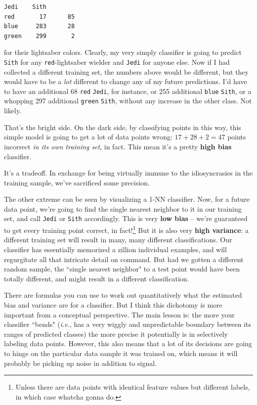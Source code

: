 \documentclass[12pt]{article}
\begin{document}
\begin{center}
\begin{Verbatim}[fontsize=\small,samepage=true,frame=none]
        Jedi    Sith
red       17      85
blue     283      28
green    299       2
\end{Verbatim}
\end{center}

for their lightsaber colors. Clearly, my very simply classifier is going to
predict \texttt{Sith} for any \texttt{red}-lightsaber wielder and
\texttt{Jedi} for anyone else. Now if I had collected a different training
set, the numbers above would be different, but they would have to be a
\textit{lot} different to change any of my future predictions. I'd have to
have an additional 68 \texttt{red} \texttt{Jedi}, for instance, or 255
additional \texttt{blue} \texttt{Sith}, or a whopping 297 additional
\texttt{green} \texttt{Sith}, without any increase in the other class. Not
likely.

That's the bright side. On the dark side, by classifying points in this way,
this simple model is going to get a lot of data points wrong: $17+28+2=47$
points incorrect \textit{in its own training set}, in fact. This mean it's a
pretty \textbf{high bias} classifier.

It's a tradeoff. In exchange for being virtually immune to the idiosyncrasies
in the training sample, we've sacrificed some precision.

The other extreme can be seen by visualizing a 1-NN classifier. Now, for a
future data point, we're going to find the single nearest neighbor to it in
our training set, and call \texttt{Jedi} or \texttt{Sith} accordingly. This is
very \textbf{low bias} -- we're guaranteed to get every training point
correct, in fact!\footnote{Unless there are data points with identical feature
values but different labels, in which case whatcha gonna do.} But it is also
very \textbf{high variance}: a different training set will result in many,
many different classifications. Our classifier has essentially memorized a
zillion individual examples, and will regurgitate all that intricate detail on
command. But had we gotten a different random sample, the ``single nearest
neighbor" to a test point would have been totally different, and might result
in a different classification.
     
There are formulas you can use to work out quantitatively what the estimated
bias and variance are for a classifier. But I think this dichotomy is more
important from a conceptual perspective. The main lesson is: the more your
classifier ``bends" (\textit{i.e.}, has a very wiggly and unpredictable
boundary between its ranges of predicted classes) the more precise it
potentially is in selectively labeling data points. However, this also means
that a lot of its decisions are going to hinge on the particular data sample
it was trained on, which means it will probably be picking up noise in
addition to signal.
\end{document}
